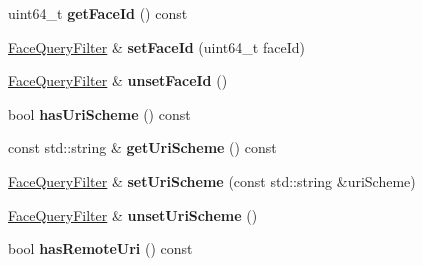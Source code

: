 \begin{DoxyCompactItemize}
\item 
uint64\+\_\+t {\bfseries get\+Face\+Id} () const\hypertarget{classndn_1_1nfd_1_1FaceQueryFilter_a1ba99b107ba8349a75d34eccbf42b0f9}{}\label{classndn_1_1nfd_1_1FaceQueryFilter_a1ba99b107ba8349a75d34eccbf42b0f9}

\item 
\hyperlink{classndn_1_1nfd_1_1FaceQueryFilter}{Face\+Query\+Filter} \& {\bfseries set\+Face\+Id} (uint64\+\_\+t face\+Id)\hypertarget{classndn_1_1nfd_1_1FaceQueryFilter_ab29a73790b14c1e7806bd8b541d2fa16}{}\label{classndn_1_1nfd_1_1FaceQueryFilter_ab29a73790b14c1e7806bd8b541d2fa16}

\item 
\hyperlink{classndn_1_1nfd_1_1FaceQueryFilter}{Face\+Query\+Filter} \& {\bfseries unset\+Face\+Id} ()\hypertarget{classndn_1_1nfd_1_1FaceQueryFilter_a74233742445913e455aeb6d0c0efd074}{}\label{classndn_1_1nfd_1_1FaceQueryFilter_a74233742445913e455aeb6d0c0efd074}

\item 
bool {\bfseries has\+Uri\+Scheme} () const\hypertarget{classndn_1_1nfd_1_1FaceQueryFilter_a4baebd9220a6395590bc96c9b55dda71}{}\label{classndn_1_1nfd_1_1FaceQueryFilter_a4baebd9220a6395590bc96c9b55dda71}

\item 
const std\+::string \& {\bfseries get\+Uri\+Scheme} () const\hypertarget{classndn_1_1nfd_1_1FaceQueryFilter_a10caabd8daee63256528652ad1676d34}{}\label{classndn_1_1nfd_1_1FaceQueryFilter_a10caabd8daee63256528652ad1676d34}

\item 
\hyperlink{classndn_1_1nfd_1_1FaceQueryFilter}{Face\+Query\+Filter} \& {\bfseries set\+Uri\+Scheme} (const std\+::string \&uri\+Scheme)\hypertarget{classndn_1_1nfd_1_1FaceQueryFilter_af780a466e2746d4e24209061c83ff99f}{}\label{classndn_1_1nfd_1_1FaceQueryFilter_af780a466e2746d4e24209061c83ff99f}

\item 
\hyperlink{classndn_1_1nfd_1_1FaceQueryFilter}{Face\+Query\+Filter} \& {\bfseries unset\+Uri\+Scheme} ()\hypertarget{classndn_1_1nfd_1_1FaceQueryFilter_a0cd85ab6de1ee2cd981453f72bd49521}{}\label{classndn_1_1nfd_1_1FaceQueryFilter_a0cd85ab6de1ee2cd981453f72bd49521}

\item 
bool {\bfseries has\+Remote\+Uri} () const\hypertarget{classndn_1_1nfd_1_1FaceQueryFilter_a39c7edef2844bf65a9c58b35dadb04e2}{}\label{classndn_1_1nfd_1_1FaceQueryFilter_a39c7edef2844bf65a9c58b35dadb04e2}


\end{DoxyCompactItemize}
